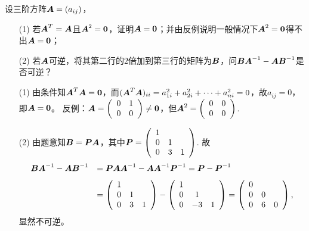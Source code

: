 \begin{frame}

\begin{li}[2006-2007第一学期]
设三阶方阵$\boldsymbol{A}=(a_{ij})$，
\begin{itemize}
\item[(1)] 若$\boldsymbol{A}^T=\boldsymbol{A}$且$\MA^2=\M0$，证明$\MA=\M0$；并由反例说明一般情况下$\MA^2=\M0$得不出$\MA=\M0$；
\item[(2)]  若$\boldsymbol{A}$可逆，将其第二行的$2$倍加到第三行的矩阵为$\boldsymbol{B}$，问$\boldsymbol{B}\boldsymbol{A}^{-1}-\boldsymbol{A}\boldsymbol{B}^{-1}$是否可逆？
\end{itemize}
\end{li}
\pause

\begin{jie}
\begin{itemize}
\item[(1)]
由条件知$\MA^T\MA=\M0$，而$(\boldsymbol{A}^T\boldsymbol{A})_{ii}=a_{1i}^2+a_{2i}^2+\cdots+a_{ni}^2=0$，故$a_{ij}=0$，即$\MA=\M0$。
反例：$\MA=\left(\begin{array}{cc}
0&1\\0&0
\end{array}\right)\ne \M0$，但$\boldsymbol{A}^2=\left(\begin{array}{cc}
0&0\\0&0
\end{array}\right)$. \pause
\item[(2)]
由题意知$\boldsymbol{B}=\boldsymbol{P}\boldsymbol{A}$，其中$\boldsymbol{P}=\left(\begin{array}{ccc}
1&&\\0&1&\\0&3&1
\end{array}\right)$. 故
$$
\begin{array}{rl}
\boldsymbol{B}\boldsymbol{A}^{-1}-\boldsymbol{A}\boldsymbol{B}^{-1}&=\boldsymbol{P}\boldsymbol{A}\boldsymbol{A}^{-1}-\boldsymbol{A}\boldsymbol{A}^{-1}\boldsymbol{P}^{-1}=\boldsymbol{P}-\boldsymbol{P}^{-1} \\[0.1in]
&=\left(\begin{array}{ccc}
1&&\\0&1&\\0&3&1
\end{array}\right)-\left(\begin{array}{ccc}
1&&\\0&1&\\0&-3&1
\end{array}\right)=\left(\begin{array}{ccc}
0&&\\0&0&\\0&6&0
\end{array}\right),
\end{array}
$$ 显然不可逆。
\end{itemize}
\end{jie}

\end{frame}

